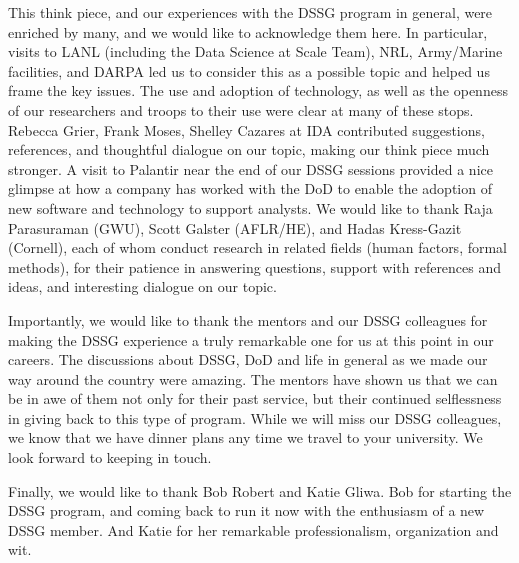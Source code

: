 \documentclass[11pt]{dssg}
\begin{document}
This think piece, and our experiences with the DSSG program in general, were enriched by many, and we would like to acknowledge them here. In particular, visits to LANL (including the Data Science at Scale Team), NRL, Army/Marine facilities, and DARPA led us to consider this as a possible topic and helped us frame the key issues. The use and adoption of technology, as well as the openness of our researchers and troops to their use were clear at many of these stops. Rebecca Grier, Frank Moses, Shelley Cazares at IDA contributed suggestions, references, and thoughtful dialogue on our topic, making our think piece much stronger. A visit to Palantir near the end of our DSSG sessions provided a nice glimpse at how a company has worked with the DoD to enable the adoption of new software and technology to support analysts. We would like to thank Raja Parasuraman (GWU), Scott Galster (AFLR/HE), and Hadas Kress-Gazit (Cornell), each of whom conduct research in related fields (human factors, formal methods), for their patience in answering questions, support with references and ideas, and interesting dialogue on our topic. 

Importantly, we would like to thank the mentors and our DSSG colleagues for making the DSSG experience a truly remarkable one for us at this point in our careers. The discussions about DSSG, DoD and life in general as we made our way around the country were amazing. The mentors have shown us that we can be in awe of them not only for their past service, but their continued selflessness in giving back to this type of program. While we will miss our DSSG colleagues, we know that we have dinner plans any time we travel to your university. We look forward to keeping in touch. 

Finally, we would like to thank Bob Robert and Katie Gliwa. Bob for starting the DSSG program, and coming back to run it now with the enthusiasm of a new DSSG member. And Katie for her remarkable professionalism, organization and wit. 


\newpage


\normalsize
\end{document}
